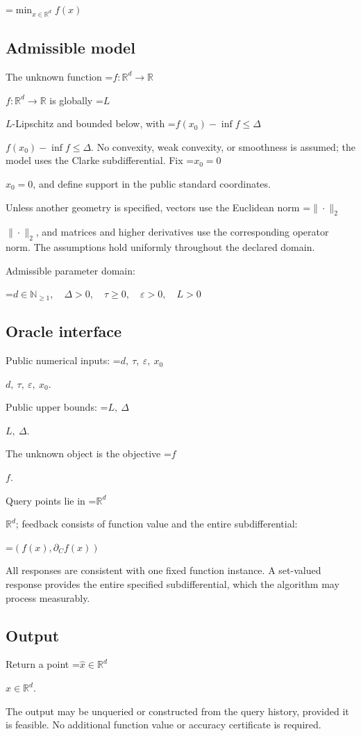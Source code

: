 \documentclass[10pt,a4paper]{article}
\newcommand{\AtlasMath}[1]{\par\begingroup\centering\setbox0=\hbox{$\displaystyle #1$}\ifdim\wd0>1.4\linewidth\typeout{ATLAS WIDE FORMULA: \the\wd0}\fi\ifdim\wd0>\linewidth\resizebox{\linewidth}{!}{\box0}\else\box0\fi\par\endgroup}
\newcommand{\AtlasInlineMath}[1]{\begingroup\setbox0=\hbox{$#1$}\ifdim\wd0>.4\linewidth\endgroup\AtlasMath{#1}\else\endgroup$#1$\fi}
\begin{document}
\AtlasMath{\min_{x\in \mathbb{R}^d}f(x)}


\subsection{Admissible model}
The unknown function \AtlasInlineMath{f:\mathbb R^d\to\mathbb R} is globally \AtlasInlineMath{L}-Lipschitz and bounded below, with \AtlasInlineMath{f(x_0)-\inf f\le\Delta}. No convexity, weak convexity, or smoothness is assumed; the model uses the Clarke subdifferential. Fix \AtlasInlineMath{x_0=0}, and define support in the public standard coordinates.

Unless another geometry is specified, vectors use the Euclidean norm \AtlasInlineMath{\|\cdot\|_2}, and matrices and higher derivatives use the corresponding operator norm. The assumptions hold uniformly throughout the declared domain.

Admissible parameter domain:


\AtlasMath{d\in\mathbb{N}_{\ge1},\quad \Delta>0,\quad \tau\ge0,\quad \varepsilon>0,\quad L>0}


\subsection{Oracle interface}
Public numerical inputs: \AtlasInlineMath{d,\ \tau,\ \varepsilon,\ x_0}.

Public upper bounds: \AtlasInlineMath{L,\ \Delta}.

The unknown object is the objective \AtlasInlineMath{f}.

Query points lie in \AtlasInlineMath{\mathbb{R}^d}; feedback consists of function value and the entire subdifferential:


\AtlasMath{(f(x),\partial_C f(x))}


All responses are consistent with one fixed function instance. A set-valued response provides the entire specified subdifferential, which the algorithm may process measurably.

\subsection{Output}
Return a point \AtlasInlineMath{\widehat x\in\mathbb R^d}.

The output may be unqueried or constructed from the query history, provided it is feasible. No additional function value or accuracy certificate is required.
\end{document}
